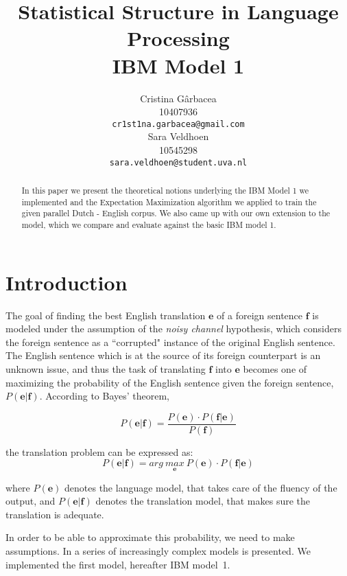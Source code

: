 \documentclass[11pt]{article}
\title{Statistical Structure in Language Processing \\ IBM Model 1}
\author{ Cristina G\^arbacea\\
  10407936 \\
  {\small \tt cr1st1na.garbacea@gmail.com} 
  \\\And
  Sara Veldhoen \\
10545298   \\
  {\small \tt sara.veldhoen@student.uva.nl} \\}
\date{}
\renewcommand{\vec}[1]{\mathbf{#1}}
\begin{document}
\maketitle

\begin{abstract}
In this paper we present the theoretical notions underlying the IBM Model 1 we implemented and the Expectation Maximization algorithm we applied to train the given parallel Dutch - English corpus. 
We also came up with our own extension to the model, which we compare and evaluate against the basic IBM model 1. 
\end{abstract}

\section{Introduction}
The goal of finding the best English translation $\vec{e}$ of a foreign sentence $\vec{f}$ is modeled under the assumption of the \textit{noisy channel} hypothesis, which considers the foreign sentence as a ``corrupted" instance of the original English sentence. The English sentence which is at the source of its foreign counterpart is an unknown issue, and thus the task of translating $\vec{f}$ into $\vec{e}$ becomes one of maximizing the probability of the English sentence given the foreign sentence, $P(\vec{e}|\vec{f})$. According to Bayes' theorem, 

\begin{equation}
P(\vec{e}|\vec{f})= \frac{P(\vec{e})\cdot P(\vec{f}|\vec{e})}{P(\vec{f})}
\end{equation}

the translation problem can be expressed as:
\begin{equation}
P(\vec{e}|\vec{f})= arg \ \underset{\vec{e}}{max} \ P(\vec{e})\cdot P(\vec{f}|\vec{e})
\end{equation}

where $P(\vec{e})$ denotes the language model, that takes care of the fluency of the output, 
 and $P(\vec{e}|\vec{f})$ denotes the translation model, that makes sure the translation is adequate. 

In order to be able to approximate this probability, we need to make assumptions. In %
a series of increasingly complex models is presented. We implemented the first model, hereafter IBM model~1. 
\end{document}
